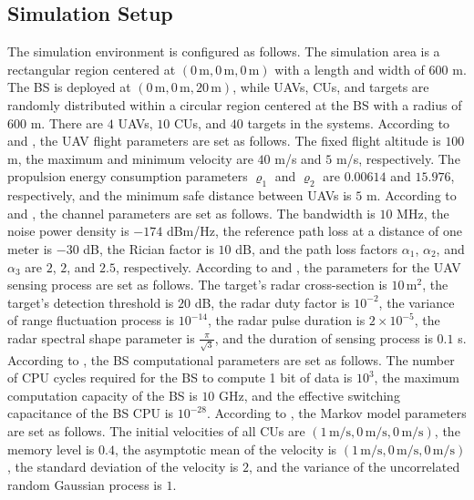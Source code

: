 \documentclass[10pt,journal,compsoc]{IEEEtran}
\begin{document}
\subsection{Simulation Setup}\label{sec: Simulation Setup}
The simulation environment is configured as follows. 
The simulation area is a rectangular region centered at $\left(0\,\text{m}, 0\,\text{m}, 0\,\text{m}\right)$ with a length and width of $600$ m. 
The BS is deployed at $\left(0\,\text{m}, 0\,\text{m}, 20\,\text{m}\right)$, while UAVs, CUs, and targets are randomly distributed within a circular region centered at the BS with a radius of $600$ m. 
There are $4$ UAVs, $10$ CUs, and $40$ targets in the systems.
According to \cite{Related works:ISCC-PRO:TWC:Joint-Sensing-And} and \cite{Simulation: UAV-Flying}, the UAV flight parameters are set as follows. 
The fixed flight altitude is $100$ m, the maximum and minimum velocity are $40$ m/s and $5$ m/s, respectively. 
The propulsion energy consumption parameters $\varrho_{1}$ and $\varrho_{2}$ are $0.00614$ and $15.976$, respectively, and the minimum safe distance between UAVs is $5$ m.
According to \cite{Related works:ISAC-PRO:IoTJ:Joint-Sensing-Communications} and \cite{Related works:ISCC:TCCN:Collaborative-Optimization-Of}, the channel parameters are set as follows. 
The bandwidth is $10$ MHz, the noise power density is $-174$ dBm/Hz, the reference path loss at a distance of one meter is $-30$ dB, the Rician factor is $10$ dB, and the path loss factors $\alpha_{1}$, $\alpha_{2}$, and $\alpha_{3}$ are $2$, $2$, and $2.5$, respectively.
According to \cite{Related works:ISAC-PRO:WCL:Integrated-Sensing-And} and \cite{Related works:ISCC-PRO:TWC:Joint-Sensing-And}, the parameters for the UAV sensing process are set as follows. 
The target's radar cross-section is $10 \, \text{m}^{2}$, the target's detection threshold is $20$ dB, the radar duty factor is $10^{-2}$, the variance of range fluctuation process is $10^{-14}$, the radar pulse duration is $2 \times 10^{-5}$, the radar spectral shape parameter is $\frac{\pi}{\sqrt{3}}$, and the duration of sensing process is $0.1$ s.
According to \cite{Related works:ISCC:TCCN:Collaborative-Optimization-Of}, the BS computational parameters are set as follows. The number of CPU cycles required for the BS to compute 1 bit of data is $10^{3}$, the maximum computation capacity of the BS is $10$ GHz, and the effective switching capacitance of the BS CPU is $10^{-28}$.
According to \cite{Simulation: Gauss-Markov-Model}, the Markov model parameters are set as follows. The initial velocities of all CUs are $\left(1\,\text{m/s}, 0\,\text{m/s}, 0\,\text{m/s}\right)$, the memory level is $0.4$, the asymptotic mean of the velocity is $\left(1\,\text{m/s}, 0\,\text{m/s}, 0\,\text{m/s}\right)$, the standard deviation of the velocity is $2$, and the variance of the uncorrelated random Gaussian process is $1$.
\end{document}
